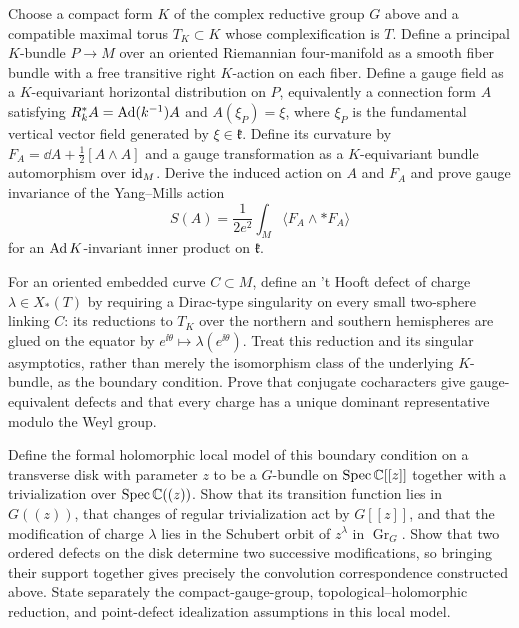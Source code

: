 \begin{exercise}
Choose a compact form $K$ of the complex reductive group $G$ above and a
compatible maximal torus $T_K\subset K$ whose complexification is $T$.  Define a
principal $K$-bundle $P\to M$ over an oriented Riemannian four-manifold as a
smooth fiber bundle with a free transitive right $K$-action on each fiber.
Define a gauge field as a $K$-equivariant horizontal distribution on $P$,
equivalently a connection form $A$ satisfying
$R_k^*A=\operatorname{Ad}(k^{-1})A$ and $A(\xi_P)=\xi$, where $\xi_P$ is the
fundamental vertical vector field generated by $\xi\in\mathfrak k$.  Define
its curvature by
$F_A=\dd A+\frac12[A\wedge A]$ and a gauge transformation as a
$K$-equivariant bundle automorphism over $\operatorname{id}_M$.  Derive the induced action
on $A$ and $F_A$ and prove gauge invariance of the Yang--Mills action
\[
 S(A)=\frac{1}{2e^2}\int_M\langle F_A\wedge *F_A\rangle
\]
for an $\operatorname{Ad} K$-invariant inner product on $\mathfrak k$.

For an oriented embedded curve $C\subset M$, define an 't Hooft defect of
charge $\lambda\in X_*(T)$ by requiring a Dirac-type singularity on every
small two-sphere linking $C$: its reductions to $T_K$ over the northern and
southern hemispheres are glued on the equator by
$e^{\ii\theta}\mapsto\lambda(e^{\ii\theta})$.  Treat this reduction and its
singular asymptotics, rather than merely the isomorphism class of the
underlying $K$-bundle, as the boundary condition.  Prove that conjugate
cocharacters give gauge-equivalent defects and that every charge has a unique
dominant representative modulo the Weyl group.

Define the formal holomorphic local model of this boundary condition on a
transverse disk with parameter $z$ to be a $G$-bundle on
$\operatorname{Spec}\mathbb C[[z]]$ together with a trivialization over
$\operatorname{Spec}\mathbb C((z))$.  Show that its transition function lies in
$G((z))$, that changes of regular trivialization act by $G[[z]]$, and that the
modification of charge $\lambda$ lies in the Schubert orbit of
$z^\lambda$ in $\operatorname{Gr}_G$.  Show that two ordered defects on the
disk determine two successive modifications, so bringing their support
together gives precisely the convolution correspondence constructed above.
State separately the compact-gauge-group, topological--holomorphic reduction,
and point-defect idealization assumptions in this local model.
\end{exercise}

